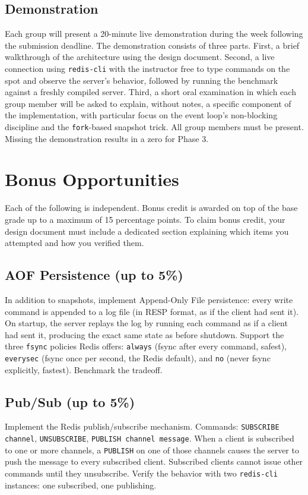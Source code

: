 \documentclass[11pt,a4paper]{article}
\begin{document}
\subsection{Demonstration}
Each group will present a 20-minute live demonstration during the week following the submission deadline. The demonstration consists of three parts. First, a brief walkthrough of the architecture using the design document. Second, a live connection using \texttt{redis-cli} with the instructor free to type commands on the spot and observe the server's behavior, followed by running the benchmark against a freshly compiled server. Third, a short oral examination in which each group member will be asked to explain, without notes, a specific component of the implementation, with particular focus on the event loop's non-blocking discipline and the \texttt{fork}-based snapshot trick. All group members must be present. Missing the demonstration results in a zero for Phase 3.

\section{Bonus Opportunities}

Each of the following is independent. Bonus credit is awarded on top of the base grade up to a maximum of 15 percentage points. To claim bonus credit, your design document must include a dedicated section explaining which items you attempted and how you verified them.

\subsection{AOF Persistence (up to 5\%)}
In addition to snapshots, implement Append-Only File persistence: every write command is appended to a log file (in RESP format, as if the client had sent it). On startup, the server replays the log by running each command as if a client had sent it, producing the exact same state as before shutdown. Support the three \texttt{fsync} policies Redis offers: \texttt{always} (fsync after every command, safest), \texttt{everysec} (fsync once per second, the Redis default), and \texttt{no} (never fsync explicitly, fastest). Benchmark the tradeoff.

\subsection{Pub/Sub (up to 5\%)}
Implement the Redis publish/subscribe mechanism. Commands: \texttt{SUBSCRIBE channel}, \texttt{UNSUBSCRIBE}, \texttt{PUBLISH channel message}. When a client is subscribed to one or more channels, a \texttt{PUBLISH} on one of those channels causes the server to push the message to every subscribed client. Subscribed clients cannot issue other commands until they unsubscribe. Verify the behavior with two \texttt{redis-cli} instances: one subscribed, one publishing.
\end{document}
